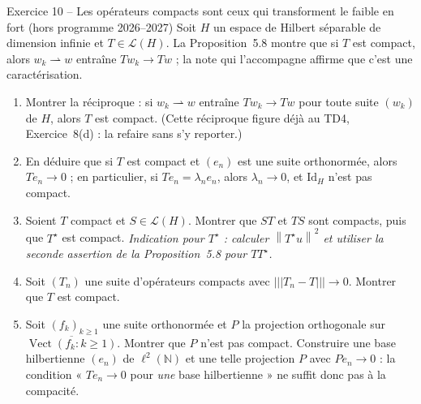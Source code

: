 \documentclass[11pt,a4paper]{article}
\newcommand{\N}{\mathbb{N}}
\newcommand{\adh}[1]{\overline{#1}}
\newcommand{\Vect}{\operatorname{Vect}}
\newcommand{\norm}[1]{\left\|#1\right\|}
\newcommand{\opnorm}[1]{|\!|\!|#1|\!|\!|}
\newcommand{\Lc}{\mathcal{L}}
\newcommand{\wk}{\rightharpoonup}
\theoremstyle{definition}
\begin{document}
\begin{exo}{Exercice 10 -- Les opérateurs compacts sont ceux qui transforment le faible en fort (hors programme 2026--2027)}
Soit $H$ un espace de Hilbert séparable de dimension infinie et $T\in\Lc(H)$. La Proposition~5.8 montre que si $T$ est compact, alors $w_k\wk w$ entraîne $Tw_k\to Tw$ ; la note qui l'accompagne affirme que c'est une caractérisation.
\begin{enumerate}[label=(\alph*)]
  \item Montrer la réciproque : si $w_k\wk w$ entraîne $Tw_k\to Tw$ pour toute suite $(w_k)$ de $H$, alors $T$ est compact. (Cette réciproque figure déjà au TD4, Exercice~8(d) : la refaire sans s'y reporter.)
  \item En déduire que si $T$ est compact et $(e_n)$ est une suite orthonormée, alors $Te_n\to0$ ; en particulier, si $Te_n=\lambda_ne_n$, alors $\lambda_n\to0$, et $\mathrm{Id}_H$ n'est pas compact.
  \item Soient $T$ compact et $S\in\Lc(H)$. Montrer que $ST$ et $TS$ sont compacts, puis que $T^\star$ est compact. \emph{Indication pour $T^\star$ : calculer $\norm{T^\star u}^2$ et utiliser la seconde assertion de la Proposition~5.8 pour $TT^\star$.}
  \item Soit $(T_n)$ une suite d'opérateurs compacts avec $\opnorm{T_n-T}\to0$. Montrer que $T$ est compact.
  \item Soit $(f_k)_{k\ge1}$ une suite orthonormée et $P$ la projection orthogonale sur $\adh{\Vect(f_k:k\ge1)}$. Montrer que $P$ n'est pas compact. Construire une base hilbertienne $(e_n)$ de $\ell^2(\N)$ et une telle projection $P$ avec $Pe_n\to0$ : la condition « $Te_n\to0$ pour \emph{une} base hilbertienne » ne suffit donc pas à la compacité.
\end{enumerate}
\end{exo}
\end{document}
